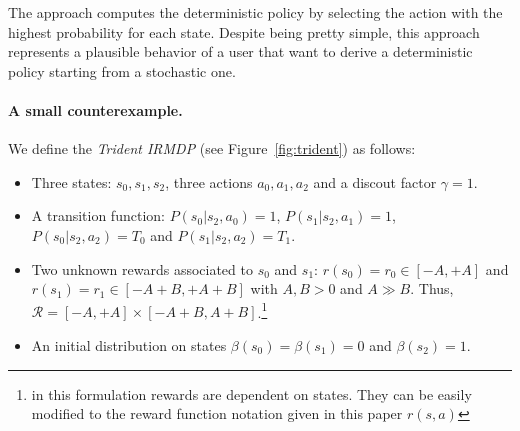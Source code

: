 The approach computes the deterministic policy by selecting the action with the highest probability for each state. Despite being pretty simple, this approach represents a plausible behavior of a user that want to derive a deterministic policy starting from a stochastic one. 
%
%
%
%
%

\paragraph{\textbf{A small counterexample.}}%

We define the \textit{Trident IRMDP} (see Figure~\ref{fig:trident}) as follows:
\begin{itemize}
\item Three states: $s_0, s_1, s_2$, three actions $a_0, a_1, a_2$ and a discout factor $\gamma=1$.
\item A transition function: $P(s_0 | s_2,a_0)=1$, $P(s_1 |s_2 ,a_1)=1$, $P(s_0 | s_2, a_2) = T_0$ and $P(s_1 | s_2, a_2) = T_1$.
\item Two unknown rewards associated to $s_0$ and $s_1$: $r(s_0)= r_0 \in [-A,+A]$ and $r(s_1)= r_1 \in [-A+B,+A+B]$ with $A,B > 0$ and $A \gg B$. Thus, $\mathcal{R} = [-A, +A]\times[-A+B, A+B]$.\footnote{in this formulation rewards are dependent on states. They can be easily modified to the reward function notation given in this paper $r(s, a)$} 	 
\item An initial distribution on states $\beta(s_0)= \beta(s_1) = 0$ and $\beta(s_2)=1$.

\end{itemize} 

